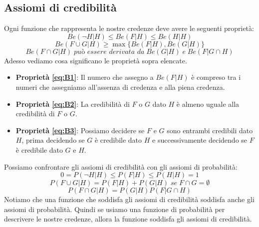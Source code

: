 \documentclass[../main.tex]{subfiles}
\begin{document}
\subsection{Assiomi di credibilità}\label{sub:assiomi_credibilita}
Ogni funzione che rappresenta le nostre credenze deve avere le seguenti proprietà:
\begin{equation}
    \label{eq:B1}
    Be(\lnot H|H) \leq Be(F|H) \leq Be(H|H)
\end{equation}
\begin{equation}
    \label{eq:B2}
    Be(F\cup G|H) \geq \max \{ Be(F|H),Be(G|H)\} 
\end{equation}
\begin{equation}
    \label{eq:B3}
    Be(F \cap G|H) \;\textit{può essere derivata da}\;  Be(G|H) \;\textit{e}\; Be(F|G \cap H)
\end{equation}
\hfill \break
Adesso vediamo cosa significano le proprietà sopra elencate.
\begin{itemize}
    \item \textbf{Proprietà \ref{eq:B1}}: Il numero che assegno a $Be(F|H)$ è compreso tra i numeri che assegniamo all'assenza di credenza e alla piena credenza.
    \item \textbf{Proprietà \ref{eq:B2}}: La credibilità di $F$ o $G$ dato $H$ è almeno uguale alla credibilità di $F$ o $G$.
    \item \textbf{Proprietà \ref{eq:B3}}: Possiamo decidere se $F$ e $G$ sono entrambi credibili dato $H$, prima decidendo se $G$ è credibile dato $H$ e successivamente decidendo se $F$ è credibile dato $G$ e $H$.
\end{itemize}
\hfill \break
Possiamo confrontare gli assiomi di credibilità con gli assiomi di probabilità:
\begin{equation}
    \label{eq:P1}
    0=P(\lnot H|H) \leq P(F|H) \leq P(H|H)=1
\end{equation}
\begin{equation}
    \label{eq:P2}
    P(F\cup G|H) = P(F|H)+P(G|H) \;\textit{se}\; F \cap G = \emptyset
\end{equation}
\begin{equation}
    \label{eq:P3}
    P(F \cap G|H) = P(G|H)P(F|G \cap H)
\end{equation}
\hfill \break
Notiamo che una funzione che soddisfa gli assiomi di credibilità soddisfa anche gli assiomi di probabilità. Quindi se usiamo una funzione di probabilità per descrivere le nostre credenze, allora la funzione soddisfa gli assiomi di credibilità.
\end{document}
